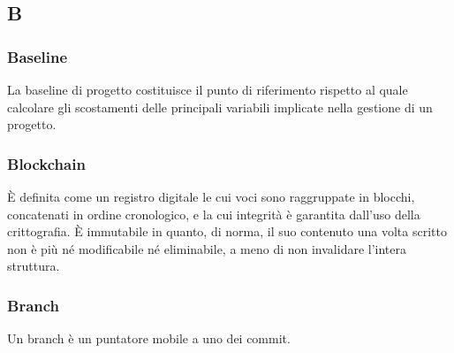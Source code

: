 \subsection*{\textbf{\hfill \Huge{B} \hfill}} 
\subsubsection*{Baseline}
La baseline di progetto costituisce il punto di riferimento rispetto al quale calcolare gli scostamenti delle principali variabili implicate nella gestione di un progetto.
\subsubsection*{Blockchain}
È definita come un registro digitale le cui voci sono raggruppate in blocchi, concatenati in ordine cronologico, e la cui integrità è garantita dall’uso della crittografia. È immutabile in quanto, di norma, il suo contenuto una volta scritto non è più né modificabile né eliminabile, a meno di non invalidare l’intera struttura.
\subsubsection*{Branch}
Un branch è un puntatore mobile a uno dei commit.
